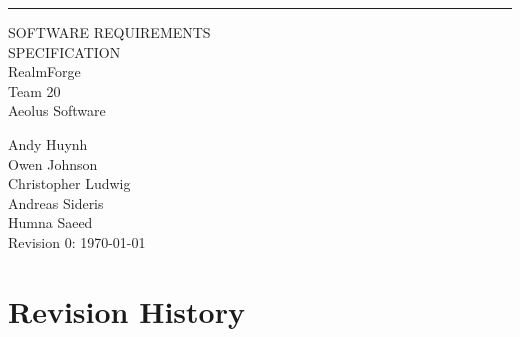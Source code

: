 \documentclass{scrreprt}
\date{}
\def\myversion{0}
\theoremstyle{definition}
\begin{document}
	
	\begin{center}
		\rule{16cm}{5pt}\vskip1cm
		\begin{bfseries}
			\Huge{SOFTWARE REQUIREMENTS\\ SPECIFICATION}\\
			\vspace{1.9cm}
			RealmForge\\
			\vspace{1.9cm}
			\Large{Team 20 \\
			Aeolus Software\\}
			\vspace{0.5cm}
		\end{bfseries}
		Andy Huynh\\
		Owen Johnson\\
		Christopher Ludwig\\
		Andreas Sideris\\
		Humna Saeed\\
		\vspace{4cm}
		Revision \myversion : \today
	\end{center}
	
	\chapter*{Revision History}
	
\end{document}
